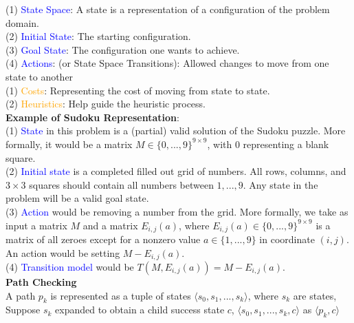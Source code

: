 \documentclass[10pt,landscape]{article}
\makeatletter
\renewcommand{\section}{\@startsection{section}{1}{0mm}%
                                {-1ex plus -.5ex minus -.2ex}%
                                {0.5ex plus .2ex}%
                                {\normalfont\large\bfseries}}
\makeatother
\begin{document}
\begin{multicols}{2}
\setlength{\premulticols}{1pt}
\setlength{\postmulticols}{1pt}
\setlength{\multicolsep}{1pt}
\setlength{\columnsep}{2pt}


(1) \textcolor{blue}{State Space}: A state is a representation of a configuration of the problem domain. \\
(2) \textcolor{blue}{Initial State}: The starting configuration. \\
(3) \textcolor{blue}{Goal State}: The configuration one wants to achieve. \\
(4) \textcolor{blue}{Actions}: (or State Space Transitions): Allowed changes to move from one state to another \\
(1) \textcolor{orange}{Costs}: Representing the cost of moving from state to state.\\
(2) \textcolor{orange}{Heuristics}: Help guide the heuristic process. \\

\textbf{Example of Sudoku Representation}: \\

(1) \textcolor{blue}{State} in this problem is a (partial) valid solution of the Sudoku puzzle. More formally, it would be a matrix $M \in \{0, . . . , 9\}^{9×9}$, with 0 representing a blank square. \\
(2) \textcolor{blue}{Initial state} is a completed filled out grid of numbers. All rows, columns, and $3 \times 3$ squares should contain all numbers between $1, . . . , 9$. Any state in the problem will be a valid goal state. \\
(3) \textcolor{blue}{Action} would be removing a number from the grid. More formally, we take as input a matrix $M$ and a matrix $E_{i,j} (a)$, where $E_{i,j} (a) \in \{0, . . . , 9\}^{9×9}$ is a matrix of all zeroes except for a nonzero value $a \in \{1, . . . , 9\}$ in coordinate $(i, j)$. An action would be setting $M - E_{i,j} (a)$. \\
(4) \textcolor{blue}{Transition model} would be $T (M, E_{i,j} (a)) = M - E_{i,j} (a)$. \\

\textbf{Path Checking} \\

A path $p_k$ is represented as a tuple of states $\langle s_0, s_1, ..., s_k \rangle$, where $s_k$ are states, Suppose $s_k$ expanded to obtain a child success state $c$, $\langle s_0, s_1, ..., s_k, c \rangle$ as $\langle p_k, c \rangle$ \\


\end{multicols}
\end{document}
